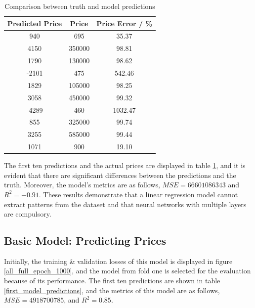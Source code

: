 \documentclass[12pt,twoside]{report}
\begin{document}
\begin{table}[!htbp]
	\centering
	\caption{Comparison between truth and model predictions}
	\label{linear_regression_predictions}
	\begin{tabular}{| c | c | c |}
		\hline
		Predicted Price & Price & Price Error  / \%\\ 
		\hline
		940 & 695 & 35.37 \\
		\hline
		4150 & 350000 & 98.81 \\
		\hline
		1790 & 130000 & 98.62 \\
		\hline
		-2101 & 475 & 542.46 \\
		\hline
		1829 & 105000 & 98.25 \\
		\hline
		3058 & 450000 & 99.32 \\
		\hline
		-4289 & 460 & 1032.47 \\
		\hline
		855 & 325000 & 99.74 \\
		\hline
		3255 & 585000 & 99.44 \\
		\hline
		1071 & 900 & 19.10 \\
		\hline
	\end{tabular}
\end{table}

The first ten predictions and the actual prices are displayed in table \ref{linear_regression_predictions}, and it is evident that there are significant differences between the predictions and the truth. Moreover, the model's metrics are as follows, $MSE = 66601086343$ and $R^2 = -0.91$. These results demonstrate that a linear regression model cannot extract patterns from the dataset and that neural networks with multiple layers are compulsory.

\subsection{Basic Model: Predicting Prices}
Initially, the training \& validation losses of this model is displayed in figure \ref{all_full_epoch_1000}, and the model from fold one is selected for the evaluation because of its performance. The first ten predictions are shown in table \ref{first_model_predictions}, and the metrics of this model are as follows, $MSE = 4918700785$, and $R^2 = 0.85$. 
\end{document}
